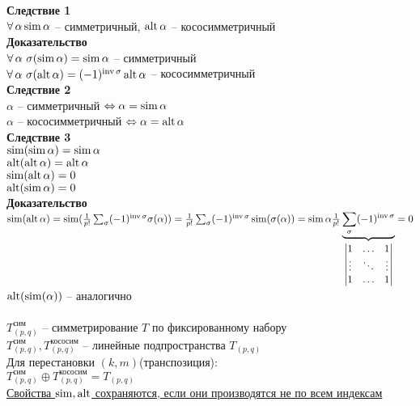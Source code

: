 \documentclass[12pt]{article}
\begin{document}
\textbf{Следствие 1}\\
$\fall \alpha \Sim \alpha$ -- симметричный, $\alt \alpha$ -- кососимметричный\\
\textbf{Доказательство}\\
$\fall \alpha\ \sigma(\Sim \alpha) = \Sim \alpha$ -- симметричный\\
$\fall \alpha\ \sigma(\alt \alpha) = (-1)^{\inv \sigma} \alt \alpha$ -- кососимметричный\\
\textbf{Следствие 2}\\
$\alpha$ -- симметричный $\LRto \alpha = \Sim \alpha$\\
$\alpha$ -- кососимметричный $\LRto \alpha = \alt \alpha$\\
\textbf{Следствие 3}\\
$\Sim (\Sim \alpha) = \Sim \alpha$\\
$\alt (\alt \alpha) = \alt \alpha$\\
$\Sim (\alt \alpha) = 0$\\
$\alt (\Sim \alpha) = 0$\\
\textbf{Доказательство}\\
$\Sim (\alt \alpha) = \Sim (\frac1{p!}\sum_{\sigma} (-1)^{\inv \sigma} \sigma(\alpha)) = \frac1{p!} \sum_\sigma (-1)^{\inv \sigma} \Sim (\sigma(\alpha)) = \Sim \alpha \frac1{p!} \ub{\begin{vmatrix}
    1 & \ldots & 1\\
    \vdots & \ddots & \vdots\\
    1 & \ldots & 1
\end{vmatrix}}{\sum_\sigma (-1)^{\inv \sigma}} = 0$\\
$\alt (\Sim (\alpha))$ -- аналогично\\\\
$T^{\text{сим}}_{(p,q)}$ -- симметрирование $T$ по фиксированному набору\\
$T^{\text{сим}}_{(p,q)}, T^{\text{кососим}}_{(p,q)}$ -- линейные подпространства $T_{(p,q)}$\\
Для перестановки $(k,m)$(транспозиция):\\
$T^{\text{сим}}_{(p,q)} \oplus T^{\text{кососим}}_{(p,q)} = T_{(p,q)}$\\
\ul{Свойства $\Sim, \alt$ сохраняются, если они производятся не по всем индексам}
\end{document}
